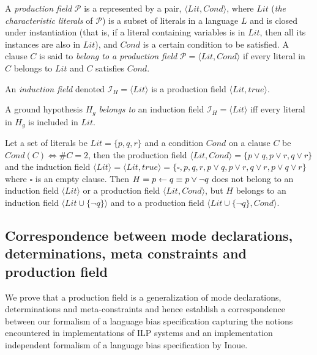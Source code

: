 \begin{defn}\cite{inoue2004induction}
A \emph{production field} $\mathcal{P}$ is a represented by a pair,
$\langle Lit, Cond\rangle$, where $Lit$
(\emph{the characteristic literals} of $\mathcal{P}$) is a subset of literals in a language $L$ and is closed under instantiation (that is, if a literal containing variables is in $Lit$, then all its instances are also in $Lit$), and $Cond$ is a certain condition to be satisfied. 
A clause $C$ is said to \emph{belong to a production field} $\mathcal{P} = \langle Lit, Cond \rangle$ if every literal in $C$ belongs to $Lit$ and $C$ satisfies $Cond$.
\end{defn}


\begin{defn}\label{induction_field_definition}\cite{yamamoto2012inverse}
An \emph{induction field} denoted $\mathcal{I}_H=\langle Lit \rangle$ is a production field $\langle Lit, true\rangle$.
\end{defn}

\begin{defn}\cite{yamamoto2012inverse}
A ground hypothesis $H_g$ \emph{belongs to} an induction field $\mathcal{I}_H=\langle Lit \rangle$ iff
every literal in $H_g$ is included in $Lit$.
\end{defn}

\begin{exmp}
Let a set of literals be $Lit=\{p, q, r\}$ and a condition $Cond$ on a clause $C$ be $Cond(C) \iff \#C=2$, then the production field
$\langle Lit, Cond \rangle = \{ p \lor q, p \lor r, q \lor r\}$ and the induction field $\langle Lit \rangle = \langle Lit, true \rangle = \{\square, p, q, r, p \lor q, p \lor r, q \lor r, p \lor q \lor r\}$ where $\square$ is an empty clause.
Then $H=p \leftarrow q \equiv p \lor \neg q$ does not belong to an induction field $\langle Lit \rangle$ or a production field $\langle Lit, Cond \rangle$, but $H$ belongs to an induction field $\langle Lit \cup \{\neg q\} \rangle$ and to a production field $\langle Lit \cup \{\neg q\}, Cond \rangle$.
\end{exmp}

\subsection{Correspondence between mode declarations, determinations, meta constraints and production field}\label{bias_correspondence}
We prove that a production field is a generalization of mode declarations, determinations and meta-constraints and hence establish a correspondence between our formalism of a language bias specification capturing the notions encountered in implementations of ILP systems and an implementation independent formalism of a language bias specification by Inoue.

